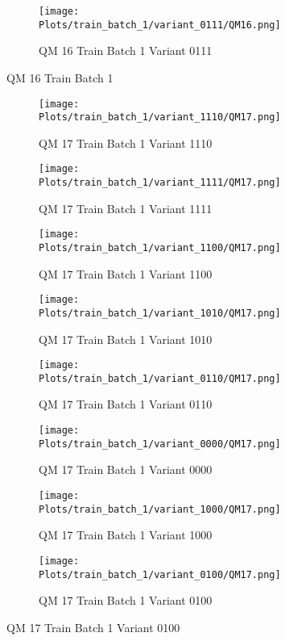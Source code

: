 \documentclass{DissertateFigs}
\begin{document}
\begin{figure}[t!]
\medskip

    \begin{subfigure}{0.33\textwidth}
    \texttt{[image: Plots/train\_batch\_1/variant\_0111/QM16.png]}
    \caption{QM 16 Train Batch 1 Variant 0111}
    \end{subfigure}
\caption{QM 16 Train Batch 1}
    \end{figure}
\clearpage
\begin{figure}[t!]
    \begin{subfigure}{0.43\textwidth}
    \texttt{[image: Plots/train\_batch\_1/variant\_1110/QM17.png]}
    \caption{QM 17 Train Batch 1 Variant 1110}
    \end{subfigure}
    \begin{subfigure}{0.43\textwidth}
    \texttt{[image: Plots/train\_batch\_1/variant\_1111/QM17.png]}
    \caption{QM 17 Train Batch 1 Variant 1111}
    \end{subfigure}

\medskip

    \begin{subfigure}{0.43\textwidth}
    \texttt{[image: Plots/train\_batch\_1/variant\_1100/QM17.png]}
    \caption{QM 17 Train Batch 1 Variant 1100}
    \end{subfigure}
    \begin{subfigure}{0.43\textwidth}
    \texttt{[image: Plots/train\_batch\_1/variant\_1010/QM17.png]}
    \caption{QM 17 Train Batch 1 Variant 1010}
    \end{subfigure}

\medskip

    \begin{subfigure}{0.43\textwidth}
    \texttt{[image: Plots/train\_batch\_1/variant\_0110/QM17.png]}
    \caption{QM 17 Train Batch 1 Variant 0110}
    \end{subfigure}
    \begin{subfigure}{0.43\textwidth}
    \texttt{[image: Plots/train\_batch\_1/variant\_0000/QM17.png]}
    \caption{QM 17 Train Batch 1 Variant 0000}
    \end{subfigure}

\medskip

    \begin{subfigure}{0.43\textwidth}
    \texttt{[image: Plots/train\_batch\_1/variant\_1000/QM17.png]}
    \caption{QM 17 Train Batch 1 Variant 1000}
    \end{subfigure}
    \begin{subfigure}{0.43\textwidth}
    \texttt{[image: Plots/train\_batch\_1/variant\_0100/QM17.png]}
    \caption{QM 17 Train Batch 1 Variant 0100}
    \end{subfigure}


\end{figure}
\end{document}
